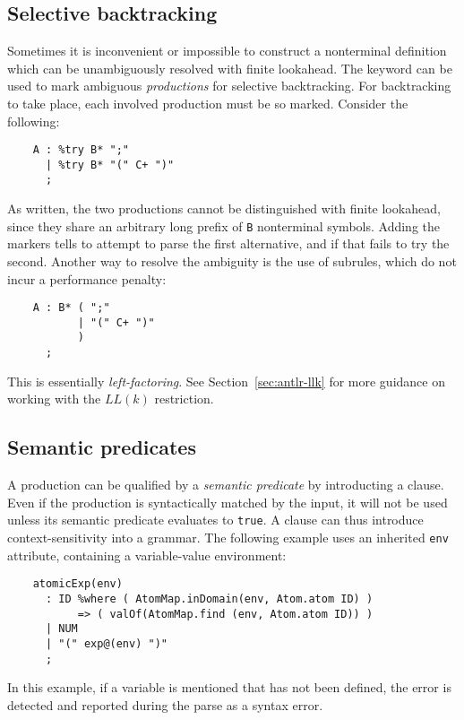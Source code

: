 \subsection{Selective backtracking}

Sometimes it is inconvenient or impossible to construct a nonterminal definition which can be unambiguously resolved with finite lookahead.%
  The  keyword can be used to mark ambiguous \emph{productions} for selective backtracking.  For backtracking to take place, each involved production must be so marked.  Consider the following:
\begin{verbatim}
    A : %try B* ";"
      | %try B* "(" C+ ")"
      ;
\end{verbatim}
As written, the two productions cannot be distinguished with finite lookahead, since they share an arbitrary long prefix of {\tt B} nonterminal symbols.  Adding the  markers tells \antlr{} to attempt to parse the first alternative, and if that fails to try the second.  Another way to resolve the ambiguity is the use of subrules, which do not incur a performance penalty:
\begin{verbatim}
    A : B* ( ";"
           | "(" C+ ")"
           )
      ;
\end{verbatim}
This is essentially \emph{left-factoring}. See Section~\ref{sec:antlr-llk} for more guidance on working with the $LL(k)$ restriction.

\subsection{Semantic predicates}

A production can be qualified by a \emph{semantic predicate} by introducting a  clause.  Even if the production is syntactically matched by the input, it will not be used unless its semantic predicate evaluates to {\tt true}.  A  clause can thus introduce context-sensitivity into a grammar.  The following example uses an inherited {\tt env} attribute, containing a variable-value environment:
\begin{verbatim}
    atomicExp(env)
      : ID %where ( AtomMap.inDomain(env, Atom.atom ID) )
           => ( valOf(AtomMap.find (env, Atom.atom ID)) )
      | NUM
      | "(" exp@(env) ")"
      ;
\end{verbatim}
In this example, if a variable is mentioned that has not been defined, the error is detected and reported during the parse as a syntax error.

